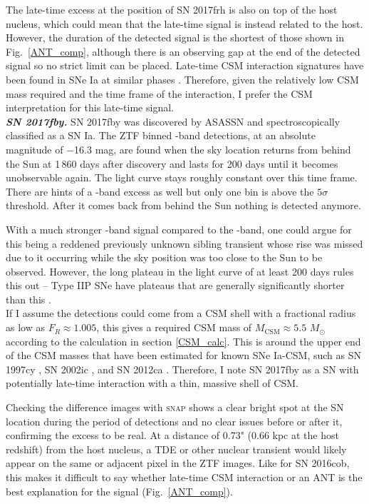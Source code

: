\documentclass[a4paper,oneside,12pt, class=Latex/Classes/PhDthesisPSnPDF, crop=false]{standalone}
\begin{document}
The late-time excess at the position of SN 2017frh is also on top of the host nucleus, which could mean that the late-time signal is instead related to the host. However, the duration of the detected signal is the shortest of those shown in Fig.~\ref{ANT_comp}, although there is an observing gap at the end of the detected signal so no strict limit can be placed. Late-time CSM interaction signatures have been found in SNe Ia at similar phases \citep{2015cp}. Therefore, given the relatively low CSM mass required and the time frame of the interaction, I prefer the CSM interpretation for this late-time signal.\\


\textit{\textbf{SN 2017fby.}}
SN 2017fby was discovered by ASASSN and spectroscopically classified as a SN Ia. The ZTF binned \ztfr-band detections, at an absolute magnitude of $-$16.3 mag, are found when the sky location returns from behind the Sun at 1\,860 days after discovery and lasts for 200 days until it becomes unobservable again. The light curve stays roughly constant over this time frame. There are hints of a \ztfg-band excess as well but only one bin is above the $5\sigma$ threshold. After it comes back from behind the Sun nothing is detected anymore.

With a much stronger \ztfr-band signal compared to the \ztfg-band, one could argue for this being a reddened previously unknown sibling transient whose rise was missed due to it occurring while the sky position was too close to the Sun to be observed. However, the long plateau in the light curve of at least 200 days rules this out -- Type IIP SNe have plateaus that are generally significantly shorter than this \citep{IIL_IIP, SN_II_V_band_lcs}.\\

If I assume the detections could come from a CSM shell with a fractional radius as low as $F_R \approx 1.005$, this gives a required CSM mass of $M_\text{CSM} \approx 5.5$ $M_\odot$ according to the calculation in section \ref{CSM_calc}. This is around the upper end of the CSM masses that have been estimated for known SNe Ia-CSM, such as SN 1997cy \citep{Chugai_2004}, SN 2002ic \citep{Chugai_2004, Inserra_2016}, and SN 2012ca \citep{Inserra_2016}. Therefore, I note SN 2017fby as a SN with potentially late-time interaction with a thin, massive shell of CSM.

Checking the difference images with \textsc{snap} shows a clear bright spot at the SN location during the period of detections and no clear issues before or after it, confirming the excess to be real. At a distance of 0.73" (0.66 kpc at the host redshift) from the host nucleus, a TDE or other nuclear transient would likely appear on the same or adjacent pixel in the ZTF images. Like for SN 2016cob, this makes it difficult to say whether late-time CSM interaction or an ANT is the best explanation for the signal (Fig.~\ref{ANT_comp}).\\
\end{document}
